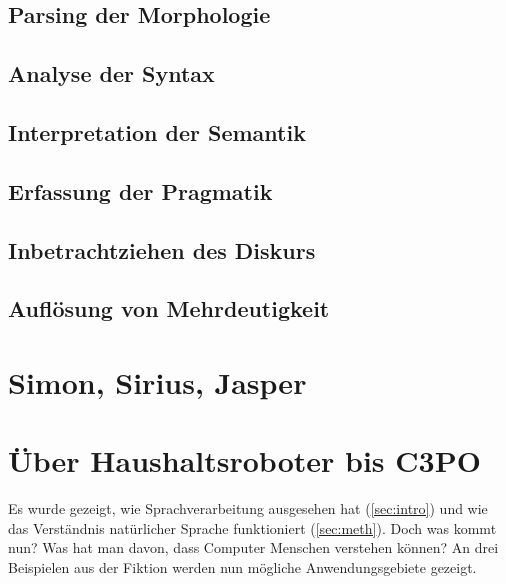 \documentclass[12pt,twoside]{article}
\theoremstyle{plain}
\theoremstyle{definition}
\theoremstyle{remark}
\begin{document}
\subsection{Parsing der Morphologie}
\label{ssec:morph}

\subsection{Analyse der Syntax}
\label{ssec:syntax}

\subsection{Interpretation der Semantik}
\label{sec:sem}

\subsection{Erfassung der Pragmatik}
\label{ssec:prag}

\subsection{Inbetrachtziehen des Diskurs}
\label{ssec:disc}

\subsection{Auflösung von Mehrdeutigkeit}
\label{ssec:ambi}

\section{Simon, Sirius, Jasper}
\label{sec:software}

\section{Über Haushaltsroboter bis C3PO}
\label{sec:ausb}
Es wurde gezeigt, wie Sprachverarbeitung ausgesehen hat (\ref{sec:intro}) und wie das Verständnis natürlicher Sprache funktioniert (\ref{sec:meth}).
Doch was kommt nun?
Was hat man davon, dass Computer Menschen verstehen können?
An drei Beispielen aus der Fiktion werden nun mögliche Anwendungsgebiete gezeigt.
\end{document}
